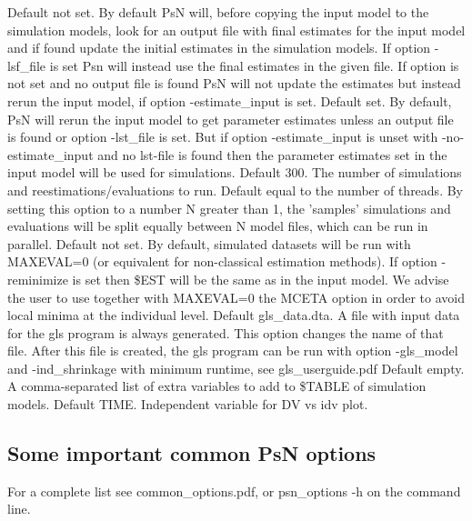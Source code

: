 \begin{optionlist}
Default not set. By default PsN will, before copying the input model to the simulation models, look for an output file with final estimates for the input model and if found update the initial estimates in the simulation models. If option -lsf\_file is set Psn will instead use the final estimates in the given file. If option is not set and no output file is found PsN will not update the estimates but instead rerun the input model, if option -estimate\_input is set. 
\nextopt
{}
Default set. By default, PsN will rerun the input model to get parameter estimates unless an output file is found or option -lst\_file is set. But if option -estimate\_input is unset with -no-estimate\_input and no lst-file is found then the parameter estimates set in the input model will be used for simulations. 
\nextopt
{}
Default 300. The number of simulations and reestimations/evaluations to run. 
\nextopt
{}
Default equal to the number of threads.
By setting this option to a number N greater than 1, the 'samples' simulations and evaluations
will be split equally between N model files, which can be run in parallel.
\nextopt
{}
Default not set. By default, simulated datasets will be run with MAXEVAL=0 (or equivalent for non-classical estimation methods). If option -reminimize is set then \$EST will be the same as in the input model. We advise the user to use together with MAXEVAL=0 the MCETA option in order to avoid local minima at the individual level.
\nextopt
{}
Default gls\_data.dta. A file with input data for the gls program is always generated. This option changes the name of that file. After this file is created, the gls program can be run with option \mbox{-gls\_model} and -ind\_shrinkage with minimum runtime, see gls\_userguide.pdf 
\nextopt
{}
Default empty. A comma-separated list of extra variables to add to \$TABLE of simulation models.
\nextopt
{}
Default TIME. Independent variable for DV vs idv plot.
\nextopt
\end{optionlist}

\subsection{Some important common PsN options}
For a complete list see common\_options.pdf, 
or psn\_options -h on the command line.


